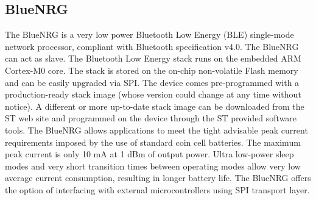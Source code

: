 \subsection{BlueNRG}
The BlueNRG is a very low power Bluetooth Low Energy (BLE) single-mode network processor, compliant with Bluetooth specification v4.0. The BlueNRG can act as slave. The Bluetooth Low Energy stack runs on the embedded ARM Cortex-M0 core. The stack is stored on the on-chip non-volatile Flash memory and can be easily upgraded via SPI. The device comes pre-programmed with a production-ready stack image (whose version could change at any time without notice). A different or more up-to-date stack image can be downloaded from the ST web site and programmed on the device through the ST provided software tools. The BlueNRG allows applications to meet the tight advisable peak current requirements imposed by the use of standard coin cell batteries. The maximum peak current is only 10 mA at 1 dBm of output power. Ultra low-power sleep modes and very short transition times between operating modes allow very low average current consumption, resulting in longer battery life. The BlueNRG offers the option of interfacing with external microcontrollers using SPI transport layer.
